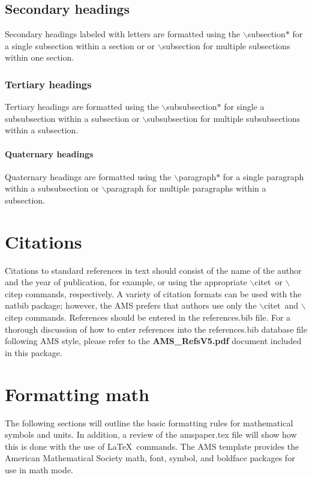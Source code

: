 \documentclass{ametsocV5}
\begin{document}
\subsection*{Secondary headings} 
Secondary headings labeled with letters are formatted using the
$\backslash$subsection$*${\tt\string{\string}} for a single
subsection within a section or
or $\backslash$subsection{\tt\string{\string}} 
for multiple
subsections within one section.

\subsubsection*{Tertiary headings} 
Tertiary headings are formatted using the
$\backslash$subsubsection$*${\tt\string{\string}} for single a subsubsection
within a subsection or
$\backslash$subsubsection{\tt\string{\string}} 
for multiple subsubsections
within a subsection. 

\paragraph*{Quaternary headings} 
Quaternary headings are formatted using the
$\backslash$paragraph$*${\tt\string{\string}} for a single paragraph within
a subsubsection or
$\backslash$paragraph{\tt\string{\string}} 
for multiple paragraphs
within a subsection.

\section{Citations}
Citations to standard references in text should consist of the name of the
author and the year of publication, for example, \citet{Becker+Schmitz2003} or
\citep{Becker+Schmitz2003} using the appropriate $\backslash$citet\ or
$\backslash$citep commands, respectively. A variety of citation formats can
be used with the natbib package; however, the AMS prefers that authors use only the $\backslash$citet\ and
$\backslash$citep commands. References should be entered in the references.bib file. For a thorough
discussion of how to enter references into the references.bib database file
following AMS style, please refer to the \textbf{AMS\_RefsV5.pdf} document
included in this package.

\section{Formatting math}
The following sections will outline the basic formatting rules for
mathematical symbols and units.  In addition, a review of the amspaper.tex
file will show how this is done with the use of \LaTeX\ commands.  The AMS
template provides the American Mathematical Society math, font, symbol, and
boldface packages for use in math mode.
\end{document}
